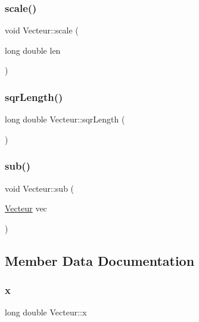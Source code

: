 \mbox{\label{classVecteur_ab4de9caff88ac8a622b6255ca58fb79c}} 
\subsubsection{\texorpdfstring{scale()}{scale()}}
{\footnotesize\ttfamily void Vecteur\+::scale (\begin{DoxyParamCaption}\item[{long double}]{len }\end{DoxyParamCaption})}

\mbox{\label{classVecteur_a02ee49c86e1940ffb520d0c2dba5b81b}} 
\subsubsection{\texorpdfstring{sqr\+Length()}{sqrLength()}}
{\footnotesize\ttfamily long double Vecteur\+::sqr\+Length (\begin{DoxyParamCaption}{ }\end{DoxyParamCaption})}

\mbox{\label{classVecteur_abb5a7f01f57a4227a18939b8c3699305}} 
\subsubsection{\texorpdfstring{sub()}{sub()}}
{\footnotesize\ttfamily void Vecteur\+::sub (\begin{DoxyParamCaption}\item[{\mbox{\hyperlink{classVecteur}{Vecteur}}}]{vec }\end{DoxyParamCaption})}



\subsection{Member Data Documentation}
\mbox{\label{classVecteur_a074a757613d59358146305d17f9234e5}} 
\subsubsection{\texorpdfstring{x}{x}}
{\footnotesize\ttfamily long double Vecteur\+::x}

